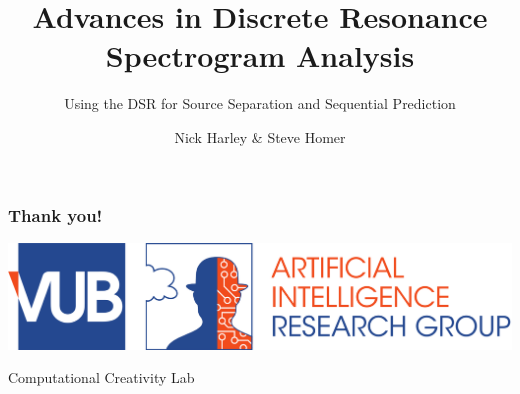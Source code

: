 \documentclass{beamer}
\begin{document}
\title{Advances in Discrete Resonance Spectrogram Analysis}
\subtitle{Using the DSR for Source Separation and Sequential Prediction}
\author{Nick Harley \& Steve Homer}
\date{}
\frame{\titlepage}





\begin{frame}
  \frametitle{Thank you!}
  \includegraphics[width=\textwidth]{dept/vub-ai.pdf}
  \begin{center}
    \huge{Computational Creativity Lab}
  \end{center}
\end{frame}
\end{document}
